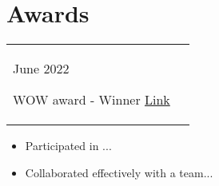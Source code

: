 \documentclass[a4paper,12pt]{article}
\begin{document}
\section{Awards}
\begin{tabularx}{\linewidth}{@{}l X@{}}	
        June 2022 \
        \begin{minipage}[t]{0.875\linewidth}
        WOW award - Winner \hfill\href{https://github.com/anth0nywong/resume-generator}{Link}
                \end{minipage}\\
        \end{tabularx}
        \begin{itemize}[nosep,after=\strut, leftmargin=1em, itemsep=3pt]
        \item Participated in ...\item Collaborated effectively with a team...
        \end{itemize}


\vfill
\end{document}
